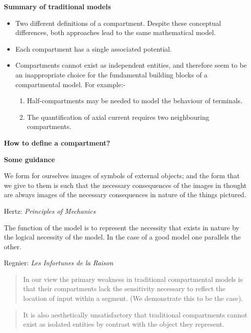 \documentclass{slides}
\begin{document}
%
%
\begin{slide}
\begin{center}
\textbf{Summary of traditional models}
\end{center}

\begin{itemize}
\item
Two different definitions of a compartment. Despite these
conceptual differences, both approaches lead to the same
mathematical model.

\item
Each compartment has a single associated potential.

\item
Compartments cannot exist as independent entities, and therefore
seem to be an inappropriate choice for the fundamental building
blocks of a compartmental model. For example:-
\begin{enumerate}
\item
Half-compartments may be needed to model the behaviour of
terminals.

\item
The quantification of axial current requires two neighbouring
compartments.
\end{enumerate}
\end{itemize}
\end{slide}

%
%
\begin{slide}
\centerline{\textbf{How to define a compartment?}}

\textbf{Some guidance}

We form for ourselves images of symbols of external objects; and
the form that we give to them is such that the necessary
consequences of the images in thought are always images of the
necessary consequences in nature of the things pictured.
\begin{flushright}
Hertz: \emph{Principles of Mechanics}
\end{flushright}

The function of the model is to represent the necessity that
exists in nature by the logical necessity of the model. In the
case of a good model one parallels the other.
\begin{flushright}
Regnier: \emph{Les Infortunes de la Raison}
\end{flushright}
\end{slide}

%
%
\begin{slide}
\vfill

\begin{quotation}
\noindent In our view the primary weakness in traditional
compartmental models is that their compartments lack the
sensitivity necessary to reflect the location of input within a
segment. (We demonstrate this to be the case).
\end{quotation}

\begin{quotation}
\noindent It is also aesthetically unsatisfactory that traditional
compartments cannot exist as isolated entities by contrast with
the object they represent.
\end{quotation}
\vfil
\end{slide}
\end{document}
